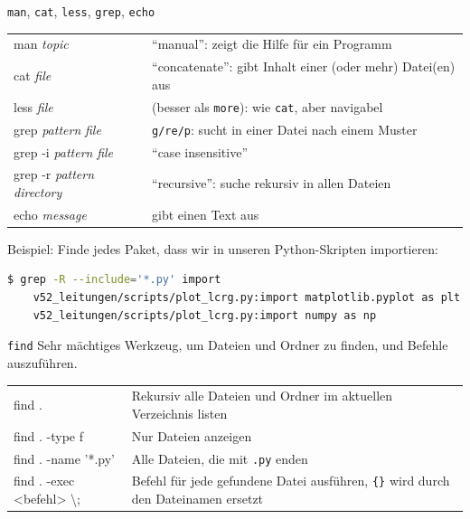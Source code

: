 \begin{frame}[fragile]{\texttt{man}, \texttt{cat}, \texttt{less}, \texttt{grep}, \texttt{echo}}
  \begin{tabu}{>{\ttfamily}l X[,L]}
    man \textit{topic}    & \enquote{manual}: zeigt die Hilfe für ein Programm \\
    cat \textit{file}                           & \enquote{concatenate}: gibt Inhalt einer (oder mehr) Datei(en) aus \\
    less \textit{file}                          & (besser als \texttt{more}): wie \texttt{cat}, aber navigabel \\
    grep \textit{pattern} \textit{file}         & \texttt{g/re/p}: sucht in einer Datei nach einem Muster \\
    grep -i \textit{pattern} \textit{file}      & \enquote{case insensitive} \\
    grep -r \textit{pattern} \textit{directory} & \enquote{recursive}: suche rekursiv in allen Dateien \\
    echo \textit{message}                       & gibt einen Text aus
  \end{tabu}

  Beispiel: Finde jedes Paket, dass wir in unseren Python-Skripten importieren:
  
  \begin{lstlisting}[language=bash]
    $ grep -R --include='*.py' import
    v52_leitungen/scripts/plot_lcrg.py:import matplotlib.pyplot as plt
    v52_leitungen/scripts/plot_lcrg.py:import numpy as np
  \end{lstlisting}

\end{frame}

\begin{frame}[fragile]{\texttt{find}}
  Sehr mächtiges Werkzeug, um Dateien und Ordner zu finden, und Befehle auszuführen.

  \begin{tabu}{>{\ttfamily}l X[,L]}
    find . & Rekursiv alle Dateien und Ordner im aktuellen Verzeichnis listen \\
    find . -type f & Nur Dateien anzeigen \\
    find . -name '*.py' & Alle Dateien, die mit \texttt{.py} enden \\
    find . -exec <befehl> \textbackslash{}; & Befehl für jede gefundene Datei ausführen, \texttt{\{\}} wird durch den Dateinamen ersetzt \\
  \end{tabu}
\end{frame}

